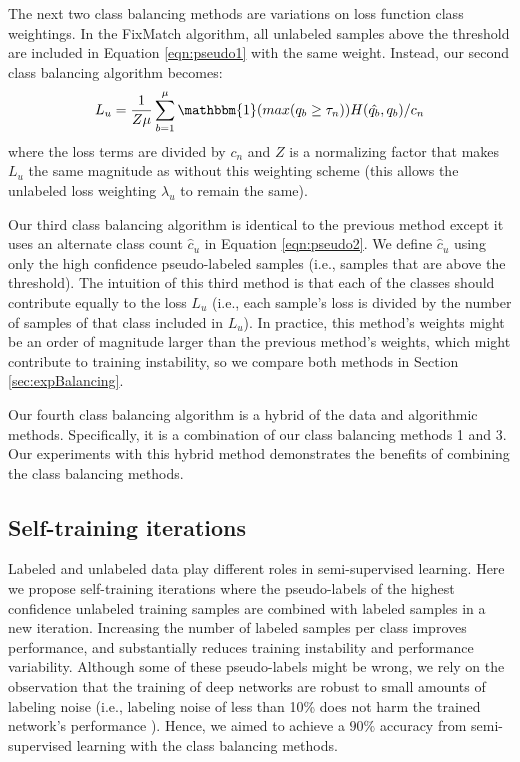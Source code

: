 \documentclass[final]{cvpr}
\newcommand{\SSL}{semi-supervised learning }
\newcommand{\SSLno}{semi-supervised learning}
\newcommand{\FM}{FixMatch }
\begin{document}
The next two class balancing methods are variations on loss function class weightings.
In the \FM algorithm, all unlabeled samples above the threshold are included in Equation \ref{eqn:pseudo1} with the same weight.
Instead, our second class balancing algorithm becomes:
\begin{equation}
L_u = \frac{1}{Z \mu} \sum_{b=1}^{\mu} \mathbbm{1} (max( q_b \geq \tau_n )) H(\hat{q_b}, q_b) / c_n
\label{eqn:pseudo3}
\end{equation}
where the loss terms are divided by $c_n$   and $ Z $ is a normalizing factor that makes $L_u$ the same magnitude as without this weighting scheme (this allows the unlabeled loss weighting $\lambda_u$ to remain the same).

Our third class balancing algorithm is identical to the previous method except it uses an alternate class count $\hat{c}_u$ in Equation \ref{eqn:pseudo2}.
We define $\hat{c}_u$ using only the high confidence pseudo-labeled samples (i.e., samples that are above the threshold).
The intuition of this third method is that each of the classes should contribute equally to the loss $L_u$ (i.e., each sample's loss is divided by the number of samples of that class included in  $L_u$).
In practice, this method's weights might be an order of magnitude larger than the previous method's weights, which might contribute to training instability, so we compare both methods in Section \ref{sec:expBalancing}.

Our fourth class balancing algorithm is a hybrid of the data and algorithmic methods.  Specifically, it is a  combination of our class balancing methods 1 and 3.  Our experiments with this hybrid method demonstrates the benefits of combining the class balancing methods.

\subsection{Self-training iterations}
\label{sec:iter}

Labeled and unlabeled data play different roles in \SSLno.  
Here we propose self-training iterations where the pseudo-labels of the highest confidence unlabeled training samples are combined with labeled samples in a new iteration.
Increasing the number of labeled samples per class improves performance, and substantially reduces training instability and performance variability.
Although some of these pseudo-labels might be wrong, we rely on the observation that the training of deep networks are robust to small amounts of labeling noise (i.e., labeling noise of less than 10\% does not harm the trained network's performance \cite{algan2019image}).
Hence, we aimed to achieve a $90\%$ accuracy from \SSL with the class balancing methods.
\end{document}
